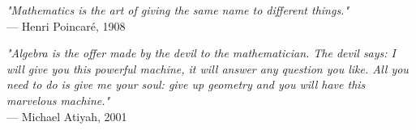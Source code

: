 \begin{flushright}
\emph{"Mathematics is the art of giving the same name to different things."} \\
 — Henri Poincaré, 1908
\end{flushright}
\vspace{2em}
\begin{flushright}
\emph{"Algebra is the offer made by the devil to the mathematician. The devil says: I will give you this powerful machine, it will answer any question you like. All you need to do is give me your soul: give up geometry and you will have this marvelous machine."}\\
 — Michael Atiyah, 2001
\end{flushright}
